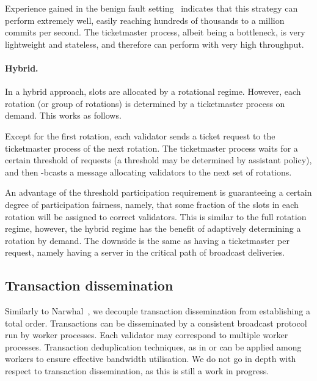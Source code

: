 Experience gained in the benign fault setting~\cite{balakrishnan2012corfu, balakrishnan2020virtual}
indicates that this strategy can perform extremely well,
easily reaching hundreds of thousands to a million commits per second.
The ticketmaster process, albeit being a bottleneck, is very lightweight and stateless, and therefore can perform
with very high throughput.

\paragraph{Hybrid.}

In a hybrid approach, slots are allocated by a rotational regime.
However, each rotation (or group of rotations) is determined by a ticketmaster process on demand.
This works as follows.

Except for the first rotation, each validator sends a ticket request to the ticketmaster process of the next rotation.
The ticketmaster process waits for a certain threshold of requests (a threshold may be determined by assistant policy),
and then \primitivesmall-bcasts a message allocating validators to the next set of rotations.

An advantage of the threshold participation requirement
is guaranteeing a certain degree of participation fairness, namely,
that some fraction of the slots in each rotation will be assigned to correct validators.
This is similar to the full rotation regime, however, the hybrid regime
has the benefit of adaptively determining a rotation by demand.
The downside is the same as having a ticketmaster per request, namely
having a server in the critical path of broadcast deliveries.

\subsection{Transaction dissemination}
Similarly to Narwhal~\cite{Narwhal}, we decouple transaction dissemination from establishing a total order.
Transactions can be disseminated by a consistent broadcast protocol run by worker processes.
Each validator may correspond to multiple worker processes.
Transaction deduplication techniques, as in \cite{Mir} or \cite{RCC} can be applied among workers to ensure effective bandwidth utilisation.
We do not go in depth with respect to transaction dissemination, as this is still a work in progress.

